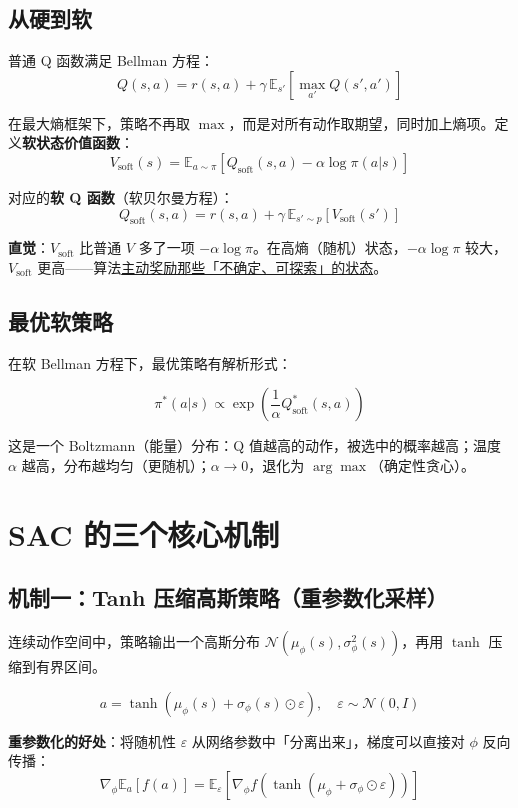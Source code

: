 \documentclass{article}
\begin{document}
\subsection*{从硬到软}

普通 Q 函数满足 Bellman 方程：
\[
Q(s,a) = r(s,a) + \gamma\,\mathbb{E}_{s'}\!\left[\max_{a'} Q(s',a')\right]
\]

在最大熵框架下，策略不再取 $\max$，而是对所有动作取期望，同时加上熵项。定义\textbf{软状态价值函数}：
\[
\boxed{V_\text{soft}(s) = \mathbb{E}_{a\sim\pi}\!\left[Q_\text{soft}(s,a) - \alpha\log\pi(a|s)\right]}
\]

对应的\textbf{软 Q 函数}（软贝尔曼方程）：
\[
\boxed{Q_\text{soft}(s,a) = r(s,a) + \gamma\,\mathbb{E}_{s'\sim p}\!\left[V_\text{soft}(s')\right]}
\]

\textbf{直觉}：$V_\text{soft}$ 比普通 $V$ 多了一项 $-\alpha\log\pi$。在高熵（随机）状态，$-\alpha\log\pi$ 较大，$V_\text{soft}$ 更高——算法\underline{主动奖励那些「不确定、可探索」的状态}。

\subsection*{最优软策略}

在软 Bellman 方程下，最优策略有解析形式：

\[
\pi^*(a|s) \propto \exp\!\left(\frac{1}{\alpha} Q_\text{soft}^*(s,a)\right)
\]

这是一个 Boltzmann（能量）分布：Q 值越高的动作，被选中的概率越高；温度 $\alpha$ 越高，分布越均匀（更随机）；$\alpha\to 0$，退化为 $\arg\max$（确定性贪心）。

\section*{SAC 的三个核心机制}

\subsection*{机制一：Tanh 压缩高斯策略（重参数化采样）}

连续动作空间中，策略输出一个高斯分布 $\mathcal{N}(\mu_\phi(s), \sigma_\phi^2(s))$，再用 $\tanh$ 压缩到有界区间。

\[
\boxed{a = \tanh\!\left(\mu_\phi(s) + \sigma_\phi(s)\odot\varepsilon\right), \quad \varepsilon\sim\mathcal{N}(0,I)}
\]

\textbf{重参数化的好处}：将随机性 $\varepsilon$ 从网络参数中「分离出来」，梯度可以直接对 $\phi$ 反向传播：
\[
\nabla_\phi \mathbb{E}_{a}[f(a)] = \mathbb{E}_\varepsilon\!\left[\nabla_\phi f\!\left(\tanh(\mu_\phi + \sigma_\phi\odot\varepsilon)\right)\right]
\]
\end{document}
